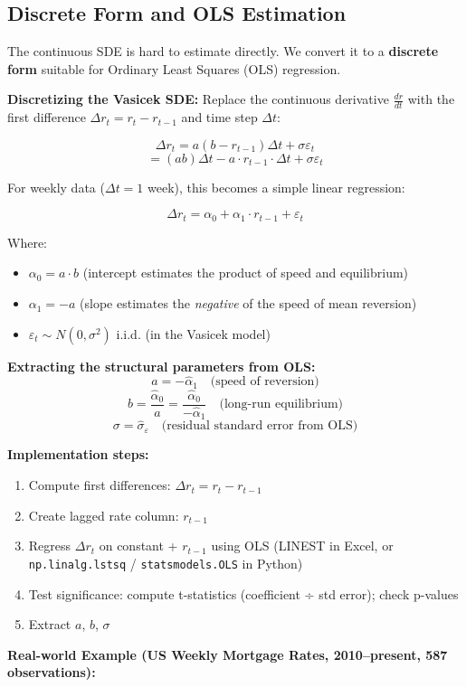 \documentclass[12pt,openany]{book}
\theoremstyle{definition}
\theoremstyle{remark}
\begin{document}
\medskip
\subsection{Discrete Form and OLS Estimation}
The continuous SDE is hard to estimate directly. We convert it to a \textbf{discrete form} suitable for Ordinary Least Squares (OLS) regression.

\textbf{Discretizing the Vasicek SDE:} Replace the continuous derivative $\frac{dr}{dt}$ with the first difference $\Delta r_t = r_t - r_{t-1}$ and time step $\Delta t$:

\[
\Delta r_t = a(b - r_{t-1})\Delta t + \sigma \varepsilon_t
\]
\[
= (ab)\Delta t - a \cdot r_{t-1} \cdot \Delta t + \sigma \varepsilon_t
\]

For weekly data ($\Delta t = 1$ week), this becomes a simple linear regression:

\[
\boxed{\Delta r_t = \alpha_0 + \alpha_1 \cdot r_{t-1} + \varepsilon_t}
\]

Where:

\begin{itemize}
\item $\alpha_0 = a \cdot b$ (intercept estimates the product of speed and equilibrium)


\item $\alpha_1 = -a$ (slope estimates the \emph{negative} of the speed of mean reversion)


\item $\varepsilon_t \sim N(0, \sigma^2)$ i.i.d. (in the Vasicek model)


\end{itemize}
\textbf{Extracting the structural parameters from OLS:} \[
a = -\hat{\alpha}_1 \quad \text{(speed of reversion)}
\] \[
b=\frac{\hat{\alpha}_0}{a}
 =\frac{\hat{\alpha}_0}{-\hat{\alpha}_1}
 \quad \text{(long-run equilibrium)}
\] \[
\sigma=\hat{\sigma}_{\varepsilon}
\quad \text{(residual standard error from OLS)}
\]

\textbf{Implementation steps:}

\begin{enumerate}
\item Compute first differences: $\Delta r_t = r_t - r_{t-1}$


\item Create lagged rate column: $r_{t-1}$


\item Regress $\Delta r_t$ on constant + $r_{t-1}$ using OLS (LINEST in Excel, or \texttt{np.linalg.lstsq} / \texttt{statsmodels.OLS} in Python)


\item Test significance: compute t-statistics (coefficient ÷ std error); check p-values


\item Extract $a$, $b$, $\sigma$


\end{enumerate}
\textbf{Real-world Example (US Weekly Mortgage Rates, 2010--present, 587 observations):}
\end{document}
